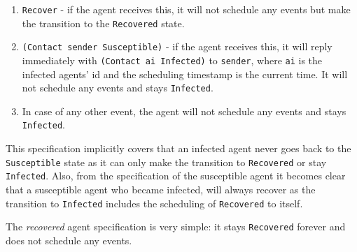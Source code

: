 \begin{enumerate}
	\item \texttt{Recover} - if the agent receives this, it will not schedule any events but make the transition to the \texttt{Recovered} state.
	
	\item \texttt{(Contact sender Susceptible)} - if the agent receives this, it will reply immediately with \texttt{(Contact ai Infected)} to \texttt{sender}, where \texttt{ai} is the infected agents' id and the scheduling timestamp is the current time. It will not schedule any events and stays \texttt{Infected}.
	
	\item In case of any other event, the agent will not schedule any events and stays \texttt{Infected}.
\end{enumerate}

This specification implicitly covers that an infected agent never goes back to the \texttt{Susceptible} state as it can only make the transition to \texttt{Recovered} or stay \texttt{Infected}. Also, from the specification of the susceptible agent it becomes clear that a susceptible agent who became infected, will always recover as the transition to \texttt{Infected} includes the scheduling of \texttt{Recovered} to itself. 

\medskip

The \textit{recovered} agent specification is very simple: it stays \texttt{Recovered} forever and does not schedule any events.